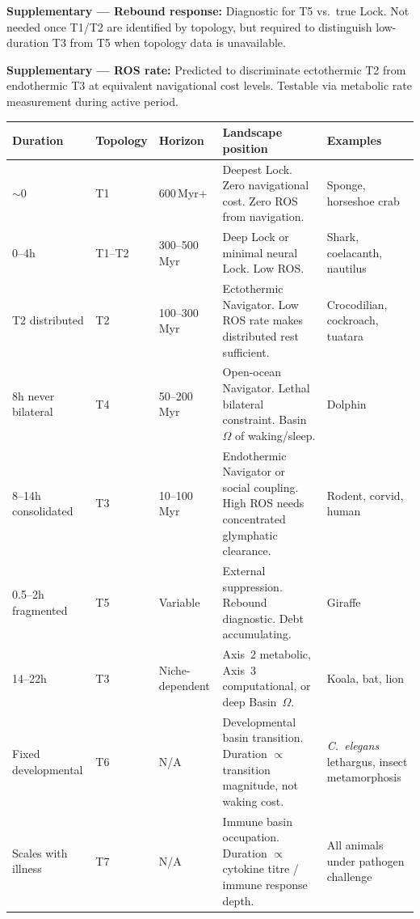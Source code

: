 \documentclass[10pt, a4paper]{article}
\begin{document}
\textbf{Supplementary --- Rebound
response:} Diagnostic for T5
vs.\ true Lock. Not needed once T1/T2
are identified by topology, but required
to distinguish low-duration T3 from T5
when topology data is unavailable.

\textbf{Supplementary --- ROS rate:}
Predicted to discriminate ectothermic
T2 from endothermic T3 at equivalent
navigational cost levels. Testable via
metabolic rate measurement during
active period.

\begin{center}
\small
\begin{tabular}{p{1.8cm}p{1.8cm}p{1.8cm}
               p{4.0cm}p{2.5cm}}
\toprule
\textbf{Duration} &
\textbf{Topology} &
\textbf{Horizon} &
\textbf{Landscape position} &
\textbf{Examples}\\
\midrule
$\sim$0 &
T1 &
600\,Myr+ &
Deepest Lock.
Zero navigational cost.
Zero ROS from navigation. &
Sponge, horseshoe crab\\[0.3em]
0--4h &
T1--T2 &
300--500\,Myr &
Deep Lock or
minimal neural Lock.
Low ROS. &
Shark, coelacanth,
nautilus\\[0.3em]
T2 distributed &
T2 &
100--300\,Myr &
Ectothermic Navigator.
Low ROS rate makes
distributed rest
sufficient. &
Crocodilian,
cockroach, tuatara\\[0.3em]
8h never bilateral &
T4 &
50--200\,Myr &
Open-ocean Navigator.
Lethal bilateral
constraint.
Basin~$\Omega$
of waking/sleep. &
Dolphin\\[0.3em]
8--14h consolidated &
T3 &
10--100\,Myr &
Endothermic Navigator
or social coupling.
High ROS needs
concentrated
glymphatic clearance. &
Rodent, corvid,
human\\[0.3em]
0.5--2h fragmented &
T5 &
Variable &
External suppression.
Rebound diagnostic.
Debt accumulating. &
Giraffe\\[0.3em]
14--22h &
T3 &
Niche-dependent &
Axis~2 metabolic,
Axis~3 computational,
or deep Basin~$\Omega$. &
Koala, bat, lion\\[0.3em]
Fixed developmental &
T6 &
N/A &
Developmental basin
transition. Duration
$\propto$ transition
magnitude, not
waking cost. &
\textit{C.~elegans}
lethargus,
insect metamorphosis\\[0.3em]
Scales with illness &
T7 &
N/A &
Immune basin
occupation. Duration
$\propto$ cytokine
titre / immune
response depth. &
All animals under
pathogen challenge\\
\bottomrule
\end{tabular}
\end{center}
\end{document}
